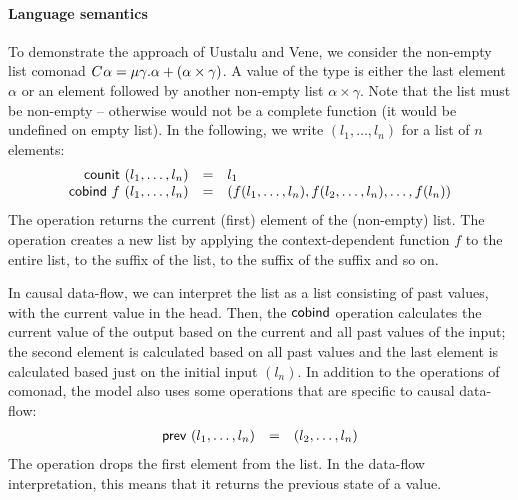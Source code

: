 \paragraph{Language semantics}
To demonstrate the approach of Uustalu and Vene, we consider the non-empty list comonad
$C^{}\alpha = \mu \gamma.\alpha + (\alpha \times \gamma)$. A value of the type is either
the last element $\alpha$ or an element followed by another non-empty list $\alpha \times \gamma$.
Note that the list must be non-empty -- otherwise  would not be a complete 
function (it would be undefined on empty list). In the following, we write $(l_1, \ldots, l_n)$
for a list of $n$ elements:
%
\begin{equation*}
\begin{array}{rcl}
\textnormal{\sffamily counit}~(l_1, \ldots, l_n) &=& l_1\\
\textnormal{\sffamily cobind}~f~(l_1, \ldots, l_n) &=& (f (l_1, \ldots, l_n), f (l_2, \ldots, l_n), \ldots, f (l_n))
\end{array}
\end{equation*}
%
The  operation returns the current (first) element of the (non-empty) list.
The  operation creates a new list by applying the context-dependent function $f$
to the entire list, to the suffix of the list, to the suffix of the suffix and so on.

In causal data-flow, we can interpret the list as a list consisting of past values, with the 
current value in the head. Then, the $\textnormal{\sffamily cobind}$ operation calculates the current value
of the output based on the current and all past values of the input; the second element is
calculated based on all past values and the last element is calculated based just on the initial
input $(l_n)$. In addition to the operations of comonad, the model also uses some operations that
are specific to causal data-flow:
%
\begin{equation*}
\begin{array}{rcl}
\textnormal{\sffamily prev}~(l_1, \ldots, l_n) &=& (l_2, \ldots, l_n)\\
\end{array}
\end{equation*}
%
The operation drops the first element from the list. In the data-flow interpretation, this means
that it returns the previous state of a value. 

